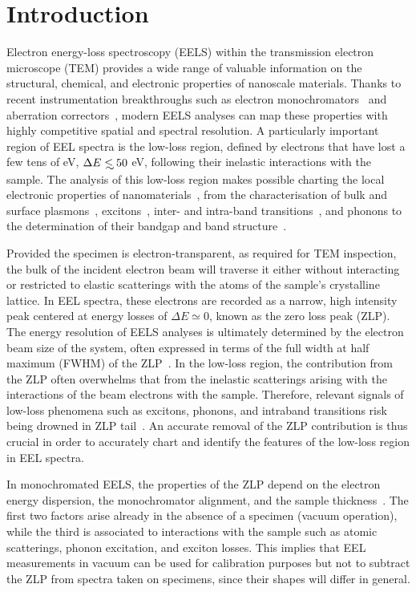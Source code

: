 \section{Introduction}
\label{sec:introduction}

Electron energy-loss spectroscopy (EELS) within the transmission electron microscope (TEM) provides
a wide range of
valuable information on the structural, chemical, and electronic properties of nanoscale materials.
%
Thanks to recent instrumentation breakthroughs
such as electron monochromators~\cite{Terauchi:2005, Freitag:2005} and aberration correctors~\cite{Haider:1998},
modern EELS analyses can map these properties with highly competitive spatial and spectral resolution.
%
A particularly important region of EEL spectra is
the low-loss region, defined by electrons that have lost a few tens of eV,
$\Delta E\lsim 50$ eV,
following their inelastic interactions with the sample.
%
The analysis of this low-loss region makes possible charting the local
electronic properties of nanomaterials~\cite{Geiger:1967}, from the characterisation of
bulk and surface plasmons~\cite{Schaffer:2008}, excitons~\cite{Erni:2005}, 
inter- and intra-band transitions~\cite{Rafferty:1998},
and phonons to the determination of their bandgap and band structure~\cite{Stoger:2008}.


Provided the specimen is electron-transparent, as required for TEM inspection,
the bulk of the incident electron beam will traverse it
either without interacting or restricted to elastic scatterings with the atoms
of the sample's crystalline lattice.
%
In EEL spectra, these electrons are recorded as a narrow,
high intensity peak centered at energy losses
of $\Delta E\simeq 0$, known as the zero loss peak (ZLP).
%
The energy resolution of EELS analyses is ultimately determined by
the electron beam size of the system, often expressed in terms
of the full width at half maximum (FWHM) of the
ZLP~\cite{Egerton:2009}.
%
In the low-loss region, the contribution from the ZLP
often overwhelms that from the inelastic scatterings arising with
the interactions of the beam electrons
with the sample.
%
Therefore, relevant signals of low-loss phenomena such as excitons,
phonons, and intraband transitions risk being drowned
in ZLP tail~\cite{Abajo:2010}.
%
An accurate removal of the ZLP
contribution is thus crucial in order to accurately chart and identify the features
of the low-loss region in EEL spectra. 

In monochromated EELS, the properties of the ZLP depend on the electron energy dispersion,
the monochromator alignment, and the sample thickness~\cite{Park:2008, Stoger:2008}.
%
The first two factors arise already in the absence of a specimen (vacuum operation),
while the third is associated
to interactions with the sample such as atomic scatterings,
phonon excitation, and exciton losses.
%
This implies that EEL measurements in vacuum can be used for calibration purposes
but not to subtract the ZLP from spectra taken on specimens, since their shapes will differ
in general.



